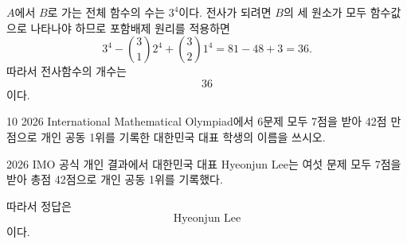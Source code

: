 \begin{solution}
$A$에서 $B$로 가는 전체 함수의 수는 $3^4$이다. 전사가 되려면 $B$의 세 원소가 모두 함수값으로 나타나야 하므로 포함배제 원리를 적용하면
\[
    3^4
    -\binom31 2^4
    +\binom32 1^4
    =81-48+3
    =36.
\]
따라서 전사함수의 개수는
\[
    \boxed{36}
\]
이다.
\end{solution}

\begin{problem}{10}
2026 International Mathematical Olympiad에서 6문제 모두 7점을 받아 42점 만점으로 개인 공동 1위를 기록한 대한민국 대표 학생의 이름을 쓰시오.
\end{problem}

\begin{solution}
2026 IMO 공식 개인 결과에서 대한민국 대표 Hyeonjun Lee는 여섯 문제 모두 7점을 받아 총점 42점으로 개인 공동 1위를 기록했다.

따라서 정답은
\[
    \boxed{\text{Hyeonjun Lee}}
\]
이다.
\end{solution}
